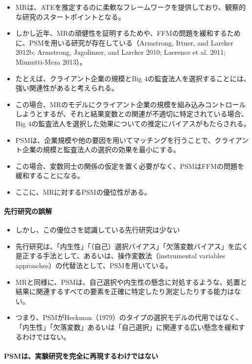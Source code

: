 \begin{itemize}
 \item MRは、ATEを推定するのに柔軟なフレームワークを提供しており、観察的な研究のスタートポイントとなる。
 \item しかし近年、MRの頑健性を証明するためや、FFMの問題を緩和するために、PSMを用いる研究が存在している（Armstrong, Ittner, and Larcker 2012b; Armstrong, Jagolinzer, and Larcker 2010; Laerence et al. 2011; Miunutti-Meza 2013）。
 \item たとえば、クライアント企業の規模とBig 4の監査法人を選択することには、強い関連性があると考えられる。
 \item この場合、MRのモデルにクライアント企業の規模を組み込みコントロールしようとするが、それと結果変数との関連が不適切に特定されている場合、Big 4の監査法人を選択した効果についての推定にバイアスがもたらされる。
 \item PSMは、企業規模や他の要因を用いてマッチングを行うことで、クライアント企業の規模と監査法人の選択の効果を最小にする。
 \item この場合、変数同士の関係の仮定を置く必要がなく、PSMはFFMの問題を緩和することになる。
 \item ここに、MRに対するPSMの優位性がある。
\end{itemize}

\paragraph{先行研究の誤解}

\begin{itemize}
 \item しかし、この優位さを認識している先行研究は少ない
 \item 先行研究は、「内生性」「（自己）選択バイアス」「欠落変数バイアス」を広く是正する手法として、あるいは、操作変数法（instrumental variables approaches）の代替法として、PSMを用いている。
 \item MRと同様に、PSMは、自己選択や内生性の懸念に対処するような、処置と結果に関連するすべての要素を正確に特定したり測定したりする能力はない。
 \item つまり、PSMがHeckman（1979）のタイプの選択モデルの代用ではなく、「内生性」「欠落変数」あるいは「自己選択」に関連する広い懸念を緩和するわけではない。
\end{itemize}

\paragraph{PSMは、実験研究を完全に再現するわけではない}

